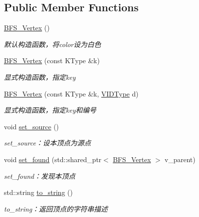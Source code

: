 \subsection*{Public Member Functions}
\begin{DoxyCompactItemize}
\item 
\hyperlink{struct_introduction_to_algorithm_1_1_graph_algorithm_1_1_b_f_s___vertex_ad9540a9d7487eea8ece6ac1b0bbfcc22}{B\+F\+S\+\_\+\+Vertex} ()
\begin{DoxyCompactList}\small\item\em 默认构造函数，将{\ttfamily color}设为白色 \end{DoxyCompactList}\item 
\hyperlink{struct_introduction_to_algorithm_1_1_graph_algorithm_1_1_b_f_s___vertex_afed1ffe004598a17dd919af3751dbe3f}{B\+F\+S\+\_\+\+Vertex} (const K\+Type \&k)
\begin{DoxyCompactList}\small\item\em 显式构造函数，指定{\ttfamily key} \end{DoxyCompactList}\item 
\hyperlink{struct_introduction_to_algorithm_1_1_graph_algorithm_1_1_b_f_s___vertex_ad55d2e534f3f1869e72a3f7513b0553f}{B\+F\+S\+\_\+\+Vertex} (const K\+Type \&k, \hyperlink{struct_introduction_to_algorithm_1_1_graph_algorithm_1_1_b_f_s___vertex_a62cef758843cdaeefae2fc196f6bdb46}{V\+I\+D\+Type} d)
\begin{DoxyCompactList}\small\item\em 显式构造函数，指定{\ttfamily key}和编号 \end{DoxyCompactList}\item 
void \hyperlink{struct_introduction_to_algorithm_1_1_graph_algorithm_1_1_b_f_s___vertex_a3f5b9ba686fae02e01cd899261fe6793}{set\+\_\+source} ()
\begin{DoxyCompactList}\small\item\em set\+\_\+source：设本顶点为源点 \end{DoxyCompactList}\item 
void \hyperlink{struct_introduction_to_algorithm_1_1_graph_algorithm_1_1_b_f_s___vertex_a7e523d76f261801c3622f00458333320}{set\+\_\+found} (std\+::shared\+\_\+ptr$<$ \hyperlink{struct_introduction_to_algorithm_1_1_graph_algorithm_1_1_b_f_s___vertex}{B\+F\+S\+\_\+\+Vertex} $>$ v\+\_\+parent)
\begin{DoxyCompactList}\small\item\em set\+\_\+found：发现本顶点 \end{DoxyCompactList}\item 
std\+::string \hyperlink{struct_introduction_to_algorithm_1_1_graph_algorithm_1_1_b_f_s___vertex_a73aa1fb33a2616818b709d04e79a007e}{to\+\_\+string} ()
\begin{DoxyCompactList}\small\item\em to\+\_\+string：返回顶点的字符串描述 \end{DoxyCompactList}\end{DoxyCompactItemize}
